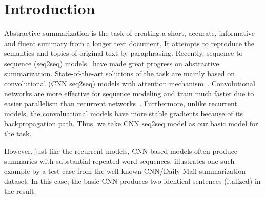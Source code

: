 \section{Introduction}
\label{sec:intro}

Abstractive summarization is the task of creating a short, accurate,
informative and fluent summary from a longer text document.
It attempts to reproduce the semantics and topics of original text
by paraphrasing. 
Recently, sequence to sequence (seq2seq)
models~\cite{RushCW15,ChopraAR16,NallapatiZSGX16,SeeLM17,PaulusXS17}
have made great progress on abstractive summarization.
State-of-the-art solutions of the task are mainly based on 
convolutional (CNN seq2seq) models with attention 
mechanism~\cite{gehring2017convs2s,FanGA18,LiuLZ18}.
Convolutional networks are more effective for sequence modeling
and train much faster due to easier parallelism 
than recurrent networks~\cite{bai2018empirical}.
Furthermore, unlike recurrent models, the convoluational models have
more stable gradients because of its backpropagation path. 
Thus, we take CNN seq2seq model as our basic model for the task.

However, just like the recurrent models, CNN-based models often produce
summaries with substantial repeated word sequences.
 illustrates one such example by a
test case from the well known CNN/Daily Mail summarization dataset. 
In this case, the basic CNN produces two 
identical sentences (italized) in the result. 

